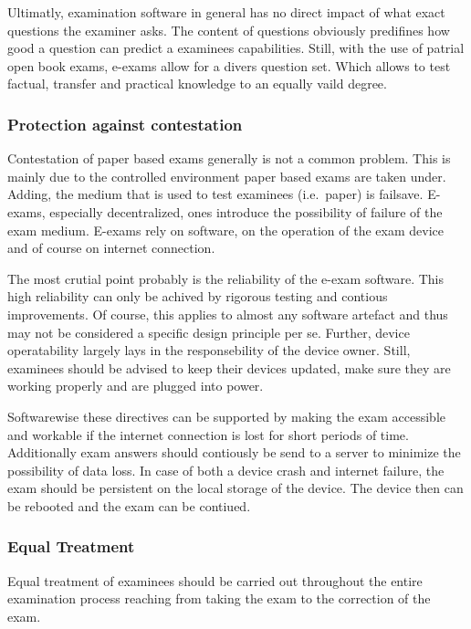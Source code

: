 Ultimatly, examination software in general has no direct impact of what
exact questions the examiner asks. The content of questions obviously
predifines how good a question can predict a examinees capabilities.
Still, with the use of patrial open book exams, e-exams allow for a
divers question set. Which allows to test factual, transfer and
practical knowledge to an equally vaild degree.

\hypertarget{protection-against-contestation}{%
\subsubsection{Protection against
contestation}\label{protection-against-contestation}}

Contestation of paper based exams generally is not a common problem.
This is mainly due to the controlled environment paper based exams are
taken under. Adding, the medium that is used to test examinees
(i.e.~paper) is failsave. E-exams, especially decentralized, ones
introduce the possibility of failure of the exam medium. E-exams rely on
software, on the operation of the exam device and of course on internet
connection.

The most crutial point probably is the reliability of the e-exam
software. This high reliability can only be achived by rigorous testing
and contious improvements. Of course, this applies to almost any
software artefact and thus may not be considered a specific design
principle per se. Further, device operatability largely lays in the
responsebility of the device owner. Still, examinees should be advised
to keep their devices updated, make sure they are working properly and
are plugged into power.

Softwarewise these directives can be supported by making the exam
accessible and workable if the internet connection is lost for short
periods of time. Additionally exam answers should contiously be send to
a server to minimize the possibility of data loss. In case of both a
device crash and internet failure, the exam should be persistent on the
local storage of the device. The device then can be rebooted and the
exam can be contiued.

\hypertarget{equal-treatment}{%
\subsubsection{Equal Treatment}\label{equal-treatment}}

Equal treatment of examinees should be carried out throughout the entire
examination process reaching from taking the exam to the correction of
the exam.

